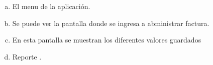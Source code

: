\documentclass[a4paper,11pt]{article}
\begin{document}
\begin{figure}[ht!]
    \hspace{0.1\linewidth}
\end{figure}

\begin{enumerate}[a)]
       \item El menu de la aplicación.
    \item Se puede ver la pantalla donde se ingresa a abministrar factura.
       \item  En esta pantalla se muestran los diferentes valores guardados 
     \item Reporte .   
\end{enumerate}
\end{document}
